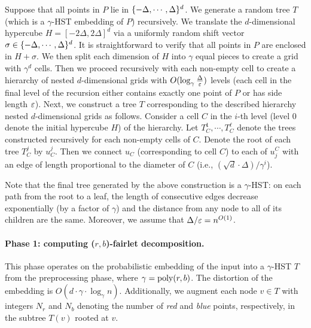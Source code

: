 Suppose that all points in $P$ lie in $\{-\Delta, \cdots, \Delta\}^d$. We generate a random tree $T$ (which is a $\gamma$-HST embedding of $P$) recursively. We translate the $d$-dimensional hypercube $H = [-2\Delta,2\Delta]^d$ via a uniformly random shift vector $\sigma\in \{-\Delta,\cdots,\Delta\}^d$. 
It is straightforward to verify that all points in $P$ are enclosed in $H + \sigma$. 
We then split each dimension of $H$ into $\gamma$ equal pieces to create a grid with $\gamma^d$ cells. 
Then we proceed recursively with each non-empty cell to create a hierarchy of nested $d$-dimensional grids with $O(\log_{\gamma} {\Delta \over \varepsilon})$ levels (each cell in the final level of the recursion either contains exactly one point of $P$ or has side length $\varepsilon$). 
Next, we construct a tree $T$ corresponding to the described hierarchy nested $d$-dimensional grids as follows. Consider a cell $C$ in the $i$-th level (level $0$ denote the initial hypercube $H$) of the hierarchy. 
Let $T^{1}_C, \cdots, T^{\ell}_C$ denote the trees constructed recursively for each non-empty cells of $C$. 
Denote the root of each tree $T^{j}_C$ by $u^{j}_C$. 
Then we connect $u_C$ (corresponding to cell $C$) to each of $u^{C}_j$ with an edge of length proportional to the diameter of $C$ (i.e., $(\sqrt{d} \cdot \Delta)/\gamma^i$). %

Note that the final tree generated by the above construction is a $\gamma$-HST: on each path from the root to a leaf, the length of consecutive edges decrease exponentially (by a factor of $\gamma$) and the distance from any node to all of its children are the same. Moreover, we assume that $\Delta/\varepsilon = n^{O(1)}$.  





\paragraph{Phase 1: computing ($r,b$)-fairlet decomposition.}  
This phase operates on the probabilistic embedding of the input into a $\gamma$-HST $T$ from the preprocessing phase, where $\gamma = \mathop{\mathrm{poly}}(r,b)$. The distortion of the embedding is $O(d\cdot \gamma \cdot \log_{\gamma} n)$. 
% 
Additionally, we augment each node $v\in T$ with integers $N_r$ and $N_b$ denoting the number of {\em red} and {\em blue} points, respectively, in the subtree $T(v)$ rooted at $v$. 
% 

